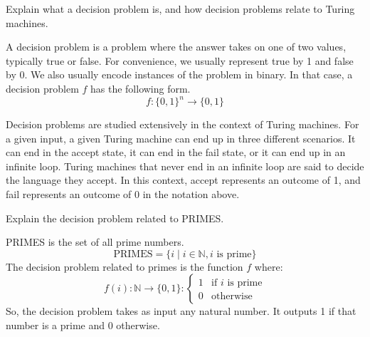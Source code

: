 \documentclass[addpoints,12pt]{exam}
\begin{document}
\begin{questions}
\begin{solution}
  \end{solution}


\question
  Explain what a decision problem is, and how decision problems relate to Turing machines.
  \begin{solution}
    A decision problem is a problem where the answer takes on one of two values, typically true or false.
    For convenience, we usually represent true by 1 and false by 0.
    We also usually encode instances of the problem in binary.
    In that case, a decision problem $f$ has the following form.
      \[ f:\{0,1\}^n \rightarrow \{0,1\} \]
    
    Decision problems are studied extensively in the context of Turing machines.
    For a given input, a given Turing machine can end up in three different scenarios.
    It can end in the accept state, it can end in the fail state, or it can end up in an infinite loop.
    Turing machines that never end in an infinite loop are said to decide the language they accept.
    In this context, accept represents an outcome of 1, and fail represents an outcome of 0 in the notation above.
  \end{solution}


\question
  Explain the decision problem related to PRIMES.
  \begin{solution}
    PRIMES is the set of all prime numbers.
      $$ \textrm{PRIMES} = \{ i \mid i \in \mathbb{N} , i \textrm{ is prime} \} $$
    The decision problem related to primes is the function $f$ where:
      $$ f(i):\mathbb{N} \rightarrow \{0,1\}: \left\{
            \begin{array}{ll}
              1 & \textrm{if } i \textrm{ is prime} \\
              0 & \textrm{otherwise}
            \end{array}
        \right. $$
    So, the decision problem takes as input any natural number.
    It outputs 1 if that number is a prime and 0 otherwise.
  \end{solution}


\end{questions}
\end{document}
